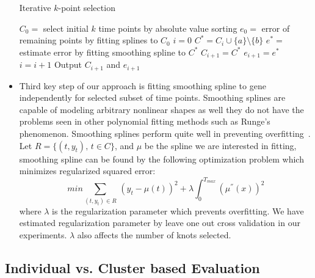 \documentclass[10pt]{article}
\begin{document}
\begin{itemize}

\begin{algorithm}
\caption{Iterative $k$-point selection}
\label{alg:algo}
\begin{algorithmic}[1]
\State $C_{0} = $ select initial $k$ time points by absolute value sorting
\State $e_{0} = $ error of remaining points by fitting splines to $C_{0}$
\State $i=0$
\Do
{}
\State $C^{*} = C_{i} \cup \{ a \} \setminus \{b\}$
\State $e^{*} = $ estimate error by fitting smoothing spline to $C^{*}$
\State $C_{i+1} = C^{*}$
\State $e_{i+1} = e^{*}$
\EndIf
\State $i = i+1$
\EndFor
{}
\State Output $C_{i+1}$ and $e_{i+1}$
\EndProcedure
\end{algorithmic}
\end{algorithm}

\item Third key step of our approach is fitting smoothing spline to gene independently for selected subset of time points. Smoothing
  splines are capable of modeling arbitrary nonlinear shapes as well
  they do not have the problems seen in other polynomial fitting
  methods such as Runge's phenomenon. Smoothing splines perform quite well in preventing overfitting~\cite{wahba1990}. Let
  $R = \{(t, y_{t}),\, t \in C\}$, and $\mu$ be the spline we are interested in fitting, smoothing spline
  can be found by the following optimization problem which minimizes
  regularized squared error:
%
\begin{equation}
min \sum_{(t, y_{t}) \in R} \,(y_{t} - \mu(t))^{2} + \lambda \int_{0}^{T_{max}} (\mu^{''}(x))^{2}
\end{equation}
%
where $\lambda$ is the regularization parameter which prevents overfitting. We have estimated regularization parameter by leave one
out cross validation in our experiments. $\lambda$ also affects the number of knots selected.

\end{itemize}


\subsection{Individual vs. Cluster based Evaluation}\label{sec:clusteval}
\end{document}
